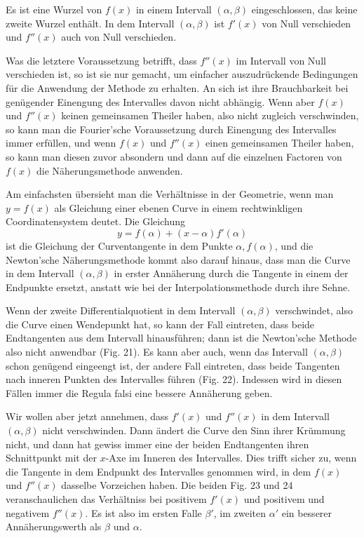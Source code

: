 \documentclass[11pt]{article}
\begin{document}
Es ist eine Wurzel von $f(x)$ in einem Intervall $(\alpha,\beta)$ eingeschlossen, das keine zweite Wurzel enthält. In dem Intervall $(\alpha,\beta)$ ist $f'(x)$ von Null verschieden und $f''(x)$ auch von Null verschieden.

Was die letztere Voraussetzung betrifft, dass $f''(x)$ im Intervall von Null verschieden ist, so ist sie nur gemacht, um einfacher auszudrückende Bedingungen für die Anwendung der Methode zu erhalten. An sich ist ihre Brauchbarkeit bei genügender Einengung des Intervalles davon nicht abhängig. Wenn aber $f(x)$ und $f''(x)$ keinen gemeinsamen Theiler haben, also nicht zugleich verschwinden, so kann man die Fourier'sche Voraussetzung durch Einengung des Intervalles immer erfüllen, und wenn $f(x)$ und $f''(x)$ einen gemeinsamen Theiler haben, so kann man diesen zuvor absondern und dann auf die einzelnen Factoren von $f(x)$ die Näherungsmethode anwenden.

Am einfachsten übersieht man die Verhältnisse in der Geometrie, wenn man $y=f(x)$ als Gleichung einer ebenen Curve in einem rechtwinkligen Coordinatensystem deutet. Die Gleichung
\[
        y=f(\alpha)+(x-\alpha)f'(\alpha)
\tag{3}
\]
ist die Gleichung der Curventangente in dem Punkte $\alpha,f(\alpha)$, und die Newton'sche Näherungsmethode kommt also darauf hinaus, dass man die Curve in dem Intervall $(\alpha,\beta)$ in erster Annäherung durch die Tangente in einem der Endpunkte ersetzt, anstatt wie bei der Interpolationsmethode durch ihre Sehne.

\weberfigtwentyone
\weberfigtwentytwo
\weberfigtwentythree
\weberfigtwentyfour

Wenn der zweite Differentialquotient in dem Intervall $(\alpha,\beta)$ verschwindet, also die Curve einen Wendepunkt hat, so kann der Fall eintreten, dass beide Endtangenten aus dem Intervall hinausführen; dann ist die Newton'sche Methode also nicht anwendbar (Fig. 21). Es kann aber auch, wenn das Intervall $(\alpha,\beta)$ schon genügend eingeengt ist, der andere Fall eintreten, dass beide Tangenten nach inneren Punkten des Intervalles führen (Fig. 22). Indessen wird in diesen Fällen immer die Regula falsi eine bessere Annäherung geben.

Wir wollen aber jetzt annehmen, dass $f'(x)$ und $f''(x)$ in dem Intervall $(\alpha,\beta)$ nicht verschwinden. Dann ändert die Curve den Sinn ihrer Krümmung nicht, und dann hat gewiss immer eine der beiden Endtangenten ihren Schnittpunkt mit der $x$-Axe im Inneren des Intervalles. Dies trifft sicher zu, wenn die Tangente in dem Endpunkt des Intervalles genommen wird, in dem $f(x)$ und $f''(x)$ dasselbe Vorzeichen haben. Die beiden Fig. 23 und 24 veranschaulichen das Verhältniss bei positivem $f'(x)$ und positivem und negativem $f''(x)$. Es ist also im ersten Falle $\beta'$, im zweiten $\alpha'$ ein besserer Annäherungswerth als $\beta$ und $\alpha$.
\end{document}
